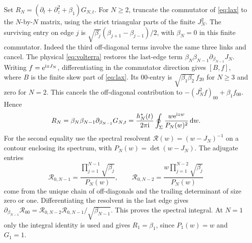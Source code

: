 Set \(R_N=(\partial_t+\partial_z^2+\beta_1)G_{N,t}\).
For \(N\ge2\), truncate the commutator of \eqref{eq:lax} to the
\(N\)-by-\(N\) matrix, using the strict triangular parts of the
finite \(J_N^2\). The surviving entry on edge \(j\) is
\(\sqrt{\beta_j}(\beta_{j+1}-\beta_{j-1})/2\), with
\(\beta_N=0\) in this finite commutator. Indeed the third
off-diagonal terms involve the same three links and cancel.
The physical \eqref{eq:volterra} restores the last-edge term
\(\beta_N\beta_{N-1}\partial_{\beta_{N-1}}J_N\).
Writing \(f=\mathrm e^{\mathrm i zJ_N}\), differentiating in the commutator
direction gives \([B,f]\), where \(B\) is the finite skew part of
\eqref{eq:lax}. Its \(00\)-entry is
\(\sqrt{\beta_1\beta_2}\,f_{20}\) for \(N\ge3\) and zero for \(N=2\).
This cancels the off-diagonal contribution to
\(- (J_N^2f)_{00}+\beta_1 f_{00}\). Hence
\begin{equation}
 R_N=\beta_N\beta_{N-1}\partial_{\beta_{N-1}}G_{N,t}
 =\frac{h_N^*(t)}{2\pi\mathrm i}\oint_\Sigma
      \frac{w\mathrm e^{\mathrm i zw}}{P_N(w)^2}\,\mathrm d w .
 \label{eq:gt-residual-contour}
\end{equation}
For the second equality use the spectral resolvent
\(\mathcal R(w)=(w-J_N)^{-1}\) on a contour enclosing its spectrum,
with \(P_N(w)=\det(w-J_N)\). The adjugate entries
\[
 \mathcal R_{0,N-1}
   =\frac{\prod_{j=1}^{N-1}\sqrt{\beta_j}}{P_N(w)},\qquad
 \mathcal R_{0,N-2}
   =\frac{w\prod_{j=1}^{N-2}\sqrt{\beta_j}}{P_N(w)}
\]
come from the unique chain of off-diagonals and the trailing
determinant of size zero or one. Differentiating the resolvent in
the last edge gives
\(\partial_{\beta_{N-1}}\mathcal R_{00}
=\mathcal R_{0,N-2}\mathcal R_{0,N-1}/\sqrt{\beta_{N-1}}\).
This proves the spectral integral. At \(N=1\) only the integral
identity is used and gives \(R_1=\beta_1\), since \(P_1(w)=w\)
and \(G_1=1\).

